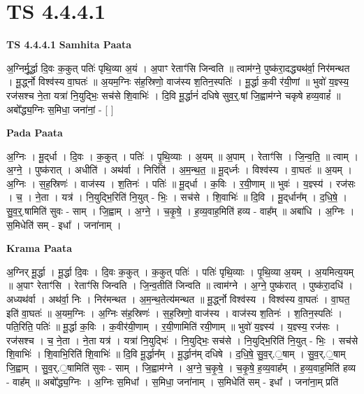 \documentclass[17pt]{extarticle}
\begin{document}
\section{ TS 4.4.4.1 }

\textbf{TS 4.4.4.1 } \newline
\textbf{Samhita Paata} \newline

अ॒ग्निर्मू॒र्द्धा दि॒वः क॒कुत् पतिः॑ पृथि॒व्या अ॒यं । अ॒पाꣳ रेताꣳ॑सि जिन्वति ॥ त्वाम॑ग्ने॒ पुष्क॑रा॒दद्ध्यथ॑र्वा॒ निर॑मन्थत । मू॒र्द्ध्नो विश्व॑स्य वा॒घतः॑ ॥ अ॒यम॒ग्निः स॑ह॒स्रिणो॒ वाज॑स्य श॒तिन॒स्पतिः॑ । मू॒र्द्धा क॒वी र॑यी॒णां ॥ भुवो॑ य॒ज्ञ्स्य॒ रज॑सश्च ने॒ता यत्रा॑ नि॒युद्भिः॒ सच॑से शि॒वाभिः॑ । दि॒वि मू॒र्द्धानं॑ दधिषे सुव॒र्॒.षां जि॒ह्वाम॑ग्ने चकृषे हव्य॒वाहं᳚ ॥ अबो᳚द्ध्य॒ग्निः स॒मिधा॒ जना॑नां॒ - [  ] \newline

\textbf{Pada Paata} \newline

अ॒ग्निः । मू॒द्‌र्धा । दि॒वः । क॒कुत् । पतिः॑ । पृ॒थि॒व्याः । अ॒यम् ॥ अ॒पाम् । रेताꣳ॑सि । जि॒न्व॒ति॒ ॥ त्वाम् । अ॒ग्ने॒ । पुष्क॑रात् । अधीति॑ । अथ॑र्वा । निरिति॑ । अ॒म॒न्थ॒त॒ ॥ मू॒द्‌र्ध्नः । विश्व॑स्य । वा॒घतः॑ ॥ अ॒यम् । अ॒ग्निः । स॒ह॒स्रिणः॑ । वाज॑स्य । श॒तिनः॑ । पतिः॑ ॥ मू॒द्‌र्धा । क॒विः । र॒यी॒णाम् ॥ भुवः॑ । य॒ज्ञ्स्य॑ । रज॑सः । च॒ । ने॒ता । यत्र॑ । नि॒युद्भि॒रिति॑ नि॒युत् - भिः॒ । सच॑से । शि॒वाभिः॑ ॥ दि॒वि । मू॒द्‌र्धान᳚म् । द॒धि॒षे॒ । सु॒व॒र्॒.षामिति॑ सुवः - साम् । जि॒ह्वाम् । अ॒ग्ने॒ । च॒कृ॒षे॒ । ह॒व्य॒वाह॒मिति॑ हव्य - वाह᳚म् ॥ अबा॑धि । अ॒ग्निः । स॒मिधेति॑ सम् - इधा᳚ । जना॑नाम् ।  \newline


\textbf{Krama Paata} \newline

अ॒ग्निर् मू॒र्द्धा । मू॒र्द्धा दि॒वः । दि॒वः क॒कुत् । क॒कुत् पतिः॑ । पतिः॑ पृथि॒व्याः । पृ॒थि॒व्या अ॒यम् । अ॒यमित्य॒यम् ॥ अ॒पाꣳ रेताꣳ॑सि । रेताꣳ॑सि जिन्वति । जि॒न्व॒तीति॑ जिन्वति ॥ त्वाम॑ग्ने । अ॒ग्ने॒ पुष्क॑रात् । पुष्क॑रा॒दधि॑ । अध्यथ॑र्वा । अथ॑र्वा॒ निः । निर॑मन्थत । अ॒म॒न्थ॒तेत्य॑मन्थत ॥ मू॒र्द्ध्नो विश्व॑स्य । विश्व॑स्य वा॒घतः॑ । वा॒घत॒ इति॑ वा॒घतः॑ ॥ अ॒यम॒ग्निः । अ॒ग्निः स॑ह॒स्रिणः॑ । स॒ह॒स्रिणो॒ वाज॑स्य । वाज॑स्य श॒तिनः॑ । श॒तिन॒स्पतिः॑ । पति॒रिति॒ पतिः॑ ॥ मू॒र्द्धा क॒विः । क॒वीर॑यी॒णाम् । र॒यी॒णामिति॑ रयी॒णाम् ॥ भुवो॑ य॒ज्ञ्स्य॑ । य॒ज्ञ्स्य॒ रज॑सः । रज॑सश्च । च॒ ने॒ता । ने॒ता यत्र॑ । यत्रा॑ नि॒युद्भिः॑ । नि॒युद्भिः॒ सच॑से । नि॒युद्भि॒रिति॑ नि॒युत् - भिः॒ । सच॑से शि॒वाभिः॑ । शि॒वाभि॒रिति॑ शि॒वाभिः॑ ॥ दि॒वि मू॒र्द्धान᳚म् । मू॒र्द्धान॑म् दधिषे । द॒धि॒षे॒ सु॒व॒र्.॒षाम् । सु॒व॒र्.॒षाम् जि॒ह्वाम् । सु॒व॒र्.॒षामिति॑ सुवः - साम् । जि॒ह्वाम॑ग्ने । अ॒ग्ने॒ च॒कृ॒षे॒ । च॒कृ॒षे॒ ह॒व्य॒वाह᳚म् । ह॒व्य॒वाह॒मिति॑ हव्य - वाह᳚म् ॥ अबो᳚द्ध्य॒ग्निः । अ॒ग्निः स॒मिधा᳚ । स॒मिधा॒ जना॑नाम् । स॒मिधेति॑ सम् - इधा᳚ । जना॑ना॒म् प्रति॑ \newline
\end{document}
